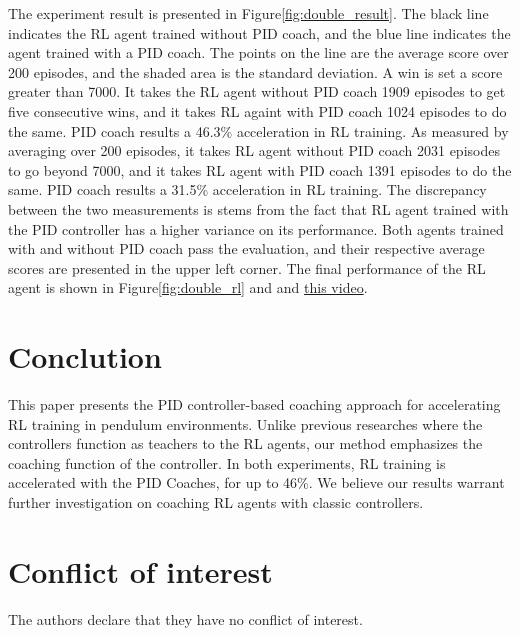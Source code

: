 The experiment result is presented in Figure\ref{fig:double_result}. The black line indicates the RL agent trained without PID coach, and the blue line indicates the agent trained with a PID coach. The points on the line are the average score over 200 episodes, and the shaded area is the standard deviation. A win is set a score greater than 7000. It takes the RL agent without PID coach 1909 episodes to get five consecutive wins, and it takes RL againt with PID coach 1024 episodes to do the same. PID coach results a 46.3\% acceleration in RL training. As measured by averaging over 200 episodes, it takes RL agent without PID coach 2031 episodes to go beyond 7000, and it takes RL agent with PID coach 1391 episodes to do the same. PID coach results a 31.5\% acceleration in RL training. The discrepancy between the two measurements is stems from the fact that RL agent trained with the PID controller has a higher variance on its performance. Both agents trained with and without PID coach pass the evaluation, and their respective average scores are presented in the upper left corner. The final performance of the RL agent is shown in Figure\ref{fig:double_rl} and and \href{https://www.youtube.com/watch?v=6zbCp-4lu_k}{this video}.


\section{Conclution}

This paper presents the PID controller-based coaching approach for accelerating RL training in pendulum environments. Unlike previous researches where the controllers function as teachers to the RL agents, our method emphasizes the coaching function of the controller. In both experiments, RL training is accelerated with the PID Coaches, for up to 46\%. We believe our results warrant further investigation on coaching RL agents with classic controllers. 


\section{Conflict of interest}
%
 The authors declare that they have no conflict of interest.





%
%



